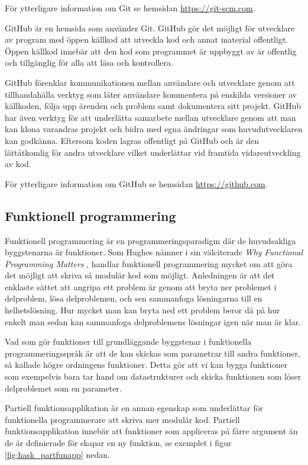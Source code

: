 \documentclass[12pt,a4paper,twoside,openright]{article}
\begin{document}
För ytterligare information om Git se hemsidan
\url{https://git-scm.com}.

\gls{GitHub} är en hemsida som använder Git. GitHub gör det möjligt
för utvecklare av program med öppen källkod att utveckla kod och annat
material offentligt. Öppen källkod innebär att den kod som programmet
är uppbyggt av är offentlig och tillgänglig för alla att läsa och
kontrollera.

GitHub förenklar kommunikationen mellan användare och utvecklare genom
att tillhandahålla verktyg som låter användare kommentera på enskilda
versioner av källkoden, följa upp ärenden och problem samt dokumentera
sitt projekt. GitHub har även verktyg för att underlätta samarbete
mellan utvecklare genom att man kan klona varandras projekt och bidra
med egna ändringar som huvudutvecklaren kan godkänna. Eftersom koden
lagras offentligt på GitHub och är den lättåtkomlig för andra
utvecklare vilket underlättar vid framtida vidareutveckling av kod.

För ytterligare information om GitHub se hemsidan
\url{https://github.com}.

\subsection{Funktionell programmering}
Funktionell programmering är en programmeringsparadigm där de
huvudsakliga byggstenarna är funktioner. Som Hughes nämner i sin
välciterade \textit{Why Functional Programming Matters}
\cite{hughes1989functional}, handlar funktionell programmering mycket
om att göra det möjligt att skriva så modulär kod som möjligt.
Anledningen är att det enklaste sättet att angripa ett problem är
genom att bryta ner problemet i delproblem, lösa delproblemen, och sen
sammanfoga lösningarna till en helhetslösning.  Hur mycket man kan
bryta ned ett problem beror då på hur enkelt man sedan kan sammanfoga
delproblemens lösningar igen när man är klar.

Vad som gör funktioner till grundläggande byggstenar i funktionella
programmeringsspråk är att de kan skickas som parametrar till andra
funktioner, så kallade högre ordningens funktioner. Detta gör att vi
kan bygga funktioner som exempelvis bara tar hand om datastrukturer
och skicka funktionen som löser delproblemet som en parameter.

Partiell funktionsapplikation är en annan egenskap som underlättar för
funktionella programmerare att skriva mer modulär kod. Partiell
funktionsapplikation innebär att funktioner som appliceras på färre
argument än de är definierade för skapar en ny funktion, se exemplet i
figur \ref{fig:hask_partfunapp} nedan.
\end{document}
